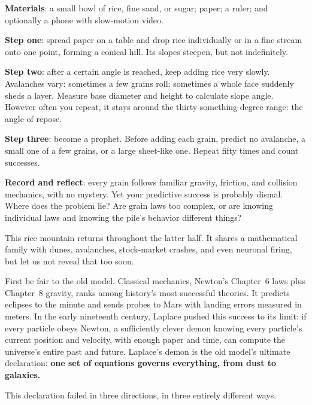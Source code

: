 \begin{experiment}
\textbf{Materials}: a small bowl of rice, fine sand, or sugar; paper; a ruler; and optionally a phone with slow-motion video.

\textbf{Step one}: spread paper on a table and drop rice individually or in a fine stream onto one point, forming a conical hill. Its slopes steepen, but not indefinitely.

\textbf{Step two}: after a certain angle is reached, keep adding rice very slowly. Avalanches vary: sometimes a few grains roll; sometimes a whole face suddenly sheds a layer. Measure base diameter and height to calculate slope angle. However often you repeat, it stays around the thirty-something-degree range: the angle of repose.

\textbf{Step three}: become a prophet. Before adding each grain, predict no avalanche, a small one of a few grains, or a large sheet-like one. Repeat fifty times and count successes.

\textbf{Record and reflect}: every grain follows familiar gravity, friction, and collision mechanics, with no mystery. Yet your predictive success is probably dismal. Where does the problem lie? Are grain laws too complex, or are knowing individual laws and knowing the pile's behavior different things?
\end{experiment}

This rice mountain returns throughout the latter half. It shares a mathematical family with dunes, avalanches, stock-market crashes, and even neuronal firing, but let us not reveal that too soon.


First be fair to the old model. Classical mechanics, Newton's Chapter~6 laws plus Chapter~8 gravity, ranks among history's most successful theories. It predicts eclipses to the minute and sends probes to Mars with landing errors measured in meters. In the early nineteenth century, Laplace pushed this success to its limit: if every particle obeys Newton, a sufficiently clever demon knowing every particle's current position and velocity, with enough paper and time, can compute the universe's entire past and future. Laplace's demon is the old model's ultimate declaration: \textbf{one set of equations governs everything, from dust to galaxies.}

This declaration failed in three directions, in three entirely different ways.

